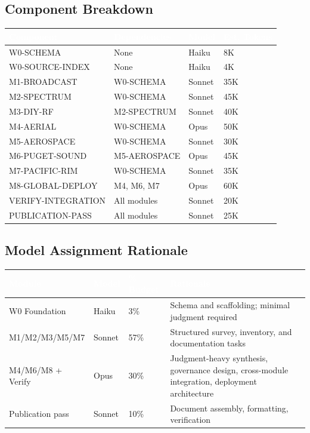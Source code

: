 \documentclass[11pt,letterpaper]{article}
\newcommand{\tableheader}[1]{\textbf{\sffamily\textcolor{white}{#1}}}
\begin{document}
\subsection{Component Breakdown}

\begin{center}
\begin{tabularx}{\textwidth}{L{2.8cm}L{3cm}C{1.8cm}C{2cm}}
\toprule
{}
\tableheader{Component} & \tableheader{Dependencies} & \tableheader{Model} & \tableheader{Est. Tokens} \\
\midrule
W0-SCHEMA & None & Haiku & 8K \\
W0-SOURCE-INDEX & None & Haiku & 4K \\
M1-BROADCAST & W0-SCHEMA & Sonnet & 35K \\
M2-SPECTRUM & W0-SCHEMA & Sonnet & 45K \\
M3-DIY-RF & M2-SPECTRUM & Sonnet & 40K \\
M4-AERIAL & W0-SCHEMA & Opus & 50K \\
M5-AEROSPACE & W0-SCHEMA & Sonnet & 30K \\
M6-PUGET-SOUND & M5-AEROSPACE & Opus & 45K \\
M7-PACIFIC-RIM & W0-SCHEMA & Sonnet & 35K \\
M8-GLOBAL-DEPLOY & M4, M6, M7 & Opus & 60K \\
VERIFY-INTEGRATION & All modules & Sonnet & 20K \\
PUBLICATION-PASS & All modules & Sonnet & 25K \\
\bottomrule
\end{tabularx}
\end{center}

\subsection{Model Assignment Rationale}

\begin{center}
\begin{tabularx}{\textwidth}{L{2.5cm}C{1.5cm}C{2cm}X}
\toprule
{}
\tableheader{Module} & \tableheader{Model} & \tableheader{\% Budget} & \tableheader{Rationale} \\
\midrule
W0 Foundation & Haiku & 3\% & Schema and scaffolding; minimal judgment required \\
M1/M2/M3/M5/M7 & Sonnet & 57\% & Structured survey, inventory, and documentation tasks \\
M4/M6/M8 + Verify & Opus & 30\% & Judgment-heavy synthesis, governance design, cross-module integration, deployment architecture \\
Publication pass & Sonnet & 10\% & Document assembly, formatting, verification \\
\bottomrule
\end{tabularx}
\end{center}
\end{document}
